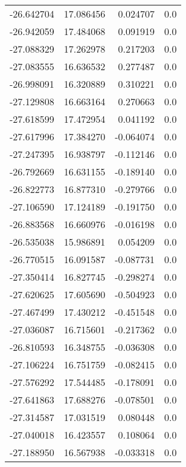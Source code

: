 \begin{tabular}{rrrr}
      -26.642704 &        17.086456 &    0.024707 &   0.0 \\
      -26.942059 &        17.484068 &    0.091919 &   0.0 \\
      -27.088329 &        17.262978 &    0.217203 &   0.0 \\
      -27.083555 &        16.636532 &    0.277487 &   0.0 \\
      -26.998091 &        16.320889 &    0.310221 &   0.0 \\
      -27.129808 &        16.663164 &    0.270663 &   0.0 \\
      -27.618599 &        17.472954 &    0.041192 &   0.0 \\
      -27.617996 &        17.384270 &   -0.064074 &   0.0 \\
      -27.247395 &        16.938797 &   -0.112146 &   0.0 \\
      -26.792669 &        16.631155 &   -0.189140 &   0.0 \\
      -26.822773 &        16.877310 &   -0.279766 &   0.0 \\
      -27.106590 &        17.124189 &   -0.191750 &   0.0 \\
      -26.883568 &        16.660976 &   -0.016198 &   0.0 \\
      -26.535038 &        15.986891 &    0.054209 &   0.0 \\
      -26.770515 &        16.091587 &   -0.087731 &   0.0 \\
      -27.350414 &        16.827745 &   -0.298274 &   0.0 \\
      -27.620625 &        17.605690 &   -0.504923 &   0.0 \\
      -27.467499 &        17.430212 &   -0.451548 &   0.0 \\
      -27.036087 &        16.715601 &   -0.217362 &   0.0 \\
      -26.810593 &        16.348755 &   -0.036308 &   0.0 \\
      -27.106224 &        16.751759 &   -0.082415 &   0.0 \\
      -27.576292 &        17.544485 &   -0.178091 &   0.0 \\
      -27.641863 &        17.688276 &   -0.078501 &   0.0 \\
      -27.314587 &        17.031519 &    0.080448 &   0.0 \\
      -27.040018 &        16.423557 &    0.108064 &   0.0 \\
      -27.188950 &        16.567938 &   -0.033318 &   0.0 \\

\end{tabular}
